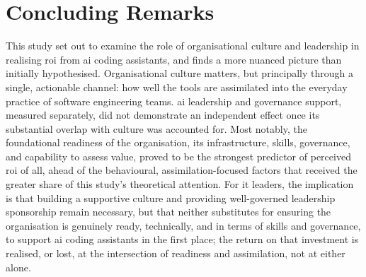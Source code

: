 \section{Concluding Remarks}
\label{sec:Concluding Remarks}
This study set out to examine the role of organisational culture and leadership in realising \gls{roi} from \gls{ai} coding assistants, and finds a more nuanced picture than initially hypothesised. Organisational culture matters, but principally through a single, actionable channel: how well the tools are assimilated into the everyday practice of software engineering teams. \gls{ai} leadership and governance support, measured separately, did not demonstrate an independent effect once its substantial overlap with culture was accounted for. Most notably, the foundational readiness of the organisation, its infrastructure, skills, governance, and capability to assess value, proved to be the strongest predictor of perceived \gls{roi} of all, ahead of the behavioural, assimilation-focused factors that received the greater share of this study's theoretical attention. For \gls{it} leaders, the implication is that building a supportive culture and providing well-governed leadership sponsorship remain necessary, but that neither substitutes for ensuring the organisation is genuinely ready, technically, and in terms of skills and governance, to support \gls{ai} coding assistants in the first place; the return on that investment is realised, or lost, at the intersection of readiness and assimilation, not at either alone.